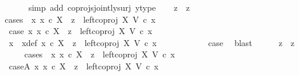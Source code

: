 \begin{isabellebody}
\ \ \ \ \isamarkupfalse%
\ {\isacharparenleft}{\kern0pt}simp\ add{\isacharcolon}{\kern0pt}\ coprojs{\isacharunderscore}{\kern0pt}jointly{\isacharunderscore}{\kern0pt}surj\ y{\isacharunderscore}{\kern0pt}type{}{\isacharparenright}{\kern0pt}\isanewline
\isanewline
\ \ \isamarkupfalse%
\ {\isachardoublequoteopen}z{}\ {\isacharequal}{\kern0pt}\ z{}{\isachardoublequoteclose}\isanewline
\ \ \isamarkupfalse%
{\isacharparenleft}{\kern0pt}cases\ {\isachardoublequoteopen}{\isasymexists}\ x{}{\isachardot}{\kern0pt}\ x{}\ {\isasymin}\isactrlsub c\ X\ {\isasymand}\ z{}\ {\isacharequal}{\kern0pt}\ left{\isacharunderscore}{\kern0pt}coproj\ X\ V\ {\isasymcirc}\isactrlsub c\ x{}{\isachardoublequoteclose}{\isacharparenright}{\kern0pt}\isanewline
\ \ \ \ \isamarkupfalse%
\ case{}{\isacharcolon}{\kern0pt}\ {\isachardoublequoteopen}{\isasymexists}x{}{\isachardot}{\kern0pt}\ x{}\ {\isasymin}\isactrlsub c\ X\ {\isasymand}\ z{}\ {\isacharequal}{\kern0pt}\ left{\isacharunderscore}{\kern0pt}coproj\ X\ V\ {\isasymcirc}\isactrlsub c\ x{}{\isachardoublequoteclose}\isanewline
\ \ \ \ \isamarkupfalse%
\ x{}\ \ x{}{\isacharunderscore}{\kern0pt}def{\isacharcolon}{\kern0pt}\ {\isachardoublequoteopen}x{}\ {\isasymin}\isactrlsub c\ X\ {\isasymand}\ z{}\ {\isacharequal}{\kern0pt}\ left{\isacharunderscore}{\kern0pt}coproj\ X\ V\ {\isasymcirc}\isactrlsub c\ x{}{\isachardoublequoteclose}\isanewline
\ \ \ \ \ \ \ \ \ \ \isamarkupfalse%
\ case{}\ \isamarkupfalse%
\ blast\isanewline
\ \ \ \ \isamarkupfalse%
\ {\isachardoublequoteopen}z{}\ {\isacharequal}{\kern0pt}\ z{}{\isachardoublequoteclose}\isanewline
\ \ \ \ \isamarkupfalse%
{\isacharparenleft}{\kern0pt}cases\ {\isachardoublequoteopen}{\isasymexists}\ x{}{\isachardot}{\kern0pt}\ x{}\ {\isasymin}\isactrlsub c\ X\ {\isasymand}\ z{}\ {\isacharequal}{\kern0pt}\ left{\isacharunderscore}{\kern0pt}coproj\ X\ V\ {\isasymcirc}\isactrlsub c\ x{}{\isachardoublequoteclose}{\isacharparenright}{\kern0pt}\isanewline
\ \ \ \ \ \ \isamarkupfalse%
\ caseA{\isacharcolon}{\kern0pt}\ {\isachardoublequoteopen}{\isasymexists}x{}{\isachardot}{\kern0pt}\ x{}\ {\isasymin}\isactrlsub c\ X\ {\isasymand}\ z{}\ {\isacharequal}{\kern0pt}\ left{\isacharunderscore}{\kern0pt}coproj\ X\ V\ {\isasymcirc}\isactrlsub c\ x{}{\isachardoublequoteclose}\isanewline

\end{isabellebody}

